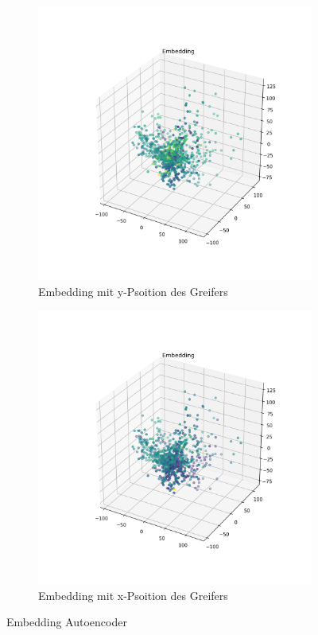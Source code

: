 	  \begin{figure}[h]
		\centering
		\begin{subfigure}[c]{0.49\textwidth}			
			\includegraphics[width=1\textwidth,center]{bilder/Hauptteil/Autoencoder_Grappel_Detection/Embedding_y.png}
			\caption{Embedding mit y-Psoition des Greifers}
			\label{img:BoxPlot_RegressionAufAutoencoder}	
		\end{subfigure}
		\begin{subfigure}[c]{0.49\textwidth}			
			\includegraphics[width=1\textwidth, center]{bilder/Hauptteil/Autoencoder_Grappel_Detection/Embedding_x.png}
			\caption{Embedding mit x-Psoition des Greifers}
			\label{img:RecalllIoUt_RegressionAufAutoencoder}	
		\end{subfigure}
		\caption{Embedding Autoencoder}
		\label{img:EmbeddingAE_M}
	\end{figure}
	
